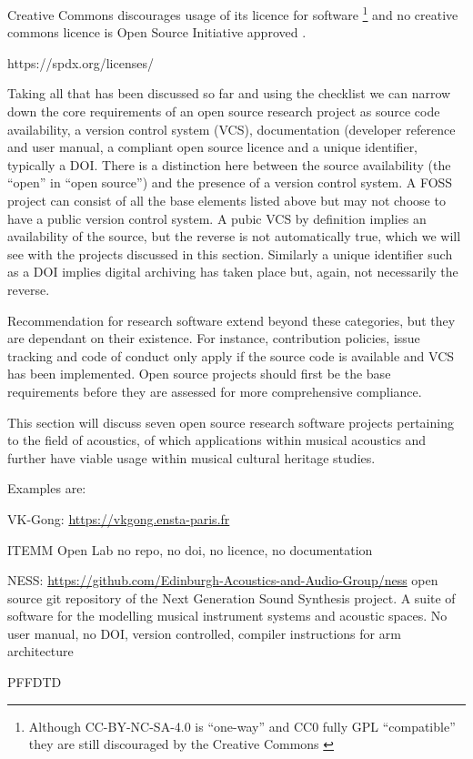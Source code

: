 Creative Commons discourages usage of its licence for software \cite{cc_can_2025}
\footnote{Although CC-BY-NC-SA-4.0 is ``one-way'' and CC0 fully GPL ``compatible'' they are still discouraged by the Creative Commons \cite{cc_faq_2016} } and no creative commons licence is Open Source Initiative approved \cite{osi_licenses_2025,spdx_licenses_2025}.

https://spdx.org/licenses/

Taking all that has been discussed so far and using the  checklist we can narrow down the core requirements of an open source research project as source code availability, a version control system (VCS), documentation (developer reference and user manual, a compliant open source licence and a unique identifier, typically a DOI. There is a distinction here between the source availability (the ``open'' in ``open source'') and the presence of a version control system. A FOSS project can consist of all the base elements listed above but may not choose to have a public version control system. A pubic VCS by definition implies an availability of the source, but the reverse is not automatically true, which we will see with the projects discussed in this section. Similarly a unique identifier such as a DOI implies digital archiving has taken place but, again, not necessarily the reverse.

Recommendation for research software extend beyond these categories, but they are dependant on their existence. For instance, contribution policies, issue tracking and code of conduct only apply if the source code is available and VCS has been implemented. Open source projects should first be the base requirements before they are assessed for more comprehensive compliance. 

This section will discuss seven open source research software projects pertaining to the field of acoustics, of which applications within musical acoustics and further have viable usage within musical cultural heritage studies.


Examples are:

\item VK-Gong: \url{https://vkgong.ensta-paris.fr}
\item ITEMM Open Lab no repo, no doi, no licence, no documentation
\item NESS: \url{https://github.com/Edinburgh-Acoustics-and-Audio-Group/ness} open source git repository of the Next Generation Sound Synthesis project. A suite of software for the modelling musical instrument systems and acoustic spaces. No user manual, no DOI, version controlled, compiler instructions for arm architecture
\item PFFDTD

